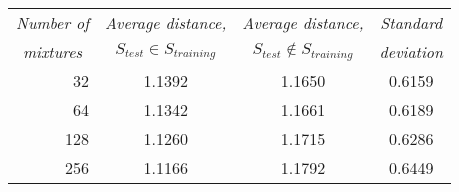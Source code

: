 \begin{table}[htbp]
	\begin{center}
		\begin{tabular}{r|c|cc}
			\toprule
			\multicolumn{1}{c}{\emph{Number of}} & \multicolumn{1}{c}{\emph{Average distance,}} & \multicolumn{1}{c}{\emph{Average distance,}} & \multicolumn{1}{c}{\emph{Standard}} \\
		\multicolumn{1}{c}{\emph{mixtures}}	& \multicolumn{1}{c}{$S_{test}\in S_{training}$} & \multicolumn{1}{c}{$S_{test}\notin S_{training}$} & \multicolumn{1}{c}{\emph{deviation}}\\
			\midrule
			32 & 1.1392 & 1.1650 & 0.6159\\
			64 & 1.1342 & 1.1661 & 0.6189\\
			128 & 1.1260 & 1.1715 & 0.6286\\
			256 & 1.1166 & 1.1792 & 0.6449\\
			\bottomrule			
		\end{tabular}		
	\end{center}
	\label{tab:accuracy_comparison_20k}	
\end{table}


